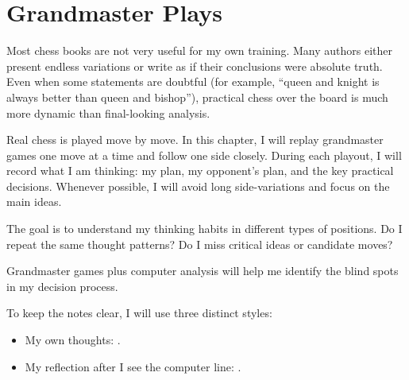 \chapter{Grandmaster Plays}
\newcommand{\engine}[1]{\texttt{#1}}
\long{}
\newcommand{\mythoughts}[1]{{\itshape #1}}

Most chess books are not very useful for my own training.  
Many authors either present endless variations or write as if their conclusions were absolute truth.  
Even when some statements are doubtful (for example, ``queen and knight is always better than queen and bishop''), practical chess over the board is much more dynamic than final-looking analysis.

Real chess is played move by move.  
In this chapter, I will replay grandmaster games one move at a time and follow one side closely.  
During each playout, I will record what I am thinking: my plan, my opponent's plan, and the key practical decisions.  
Whenever possible, I will avoid long side-variations and focus on the main ideas.

The goal is to understand my thinking habits in different types of positions.  
Do I repeat the same thought patterns?  
Do I miss critical ideas or candidate moves?

Grandmaster games plus computer analysis will help me identify the blind spots in my decision process.

To keep the notes clear, I will use three distinct styles:
\begin{itemize}
  \item My own thoughts: . 
  \item My reflection after I see the computer line: . 
\end{itemize}








